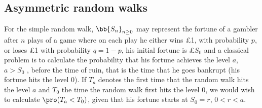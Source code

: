 \subsection{Asymmetric random walks}

\begin{example}\label{exa:randam_walk_simple}
For the simple random walk, $\bb{S_n}_{n\geq 0}$ may represent the fortune of a gambler after $n$ plays of a game where on each play he either wins \pounds 1, with probability $p$, or loses \pounds 1 with probability $q =
1-p$, his initial fortune is \pounds $S_0$ and a classical problem is to calculate the probability that his fortune achieves the level $a$, $a > S_0$ , before the time of ruin, that is the time that he goes bankrupt (his
fortune hits the level 0). If $T_a$ denotes the first time that the random walk hits the level $a$ and $T_0$ the time the random walk first hits the level 0, we would wish to calculate $\pro (T_a < T_0)$, given that his
fortune starts at $S_0 = r$, $0 < r < a$.
%
%
%
%
%
%
%
%
%
%
%
%
%
%
%



\end{example}
